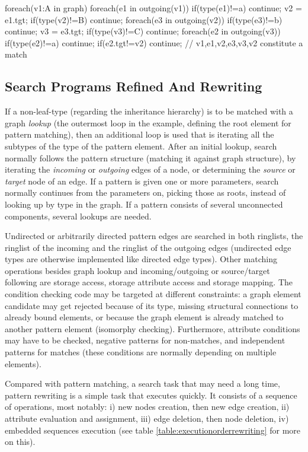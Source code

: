 \begin{csharp}
foreach(v1:A in graph) {
	foreach(e1 in outgoing(v1)) {
		if(type(e1)!=a) continue;
		v2 = e1.tgt;
		if(type(v2)!=B) continue;
		foreach(e3 in outgoing(v2)) {
			if(type(e3)!=b) continue;
			v3 = e3.tgt;
			if(type(v3)!=C) continue;
			foreach(e2 in outgoing(v3)) {
				if(type(e2)!=a) continue;
				if(e2.tgt!=v2) continue;
				// v1,e1,v2,e3,v3,v2 constitute a match
			} 
		}
	}
}
\end{csharp}

\pagebreak

\subsection*{Search Programs Refined And Rewriting} %

If a non-leaf-type (regarding the inheritance hierarchy) is to be matched with a graph \emph{lookup} (the outermost loop in the example, defining the root element for pattern matching), then an additional loop is used that is iterating all the subtypes of the type of the pattern element.
After an initial lookup, search normally follows the pattern structure (matching it against graph structure), by iterating the \emph{incoming} or \emph{outgoing} edges of a node, or determining the \emph{source} or \emph{target} node of an edge.
If a pattern is given one or more parameters, search normally continues from the parameters on, picking those as roots, instead of looking up by type in the graph.
If a pattern consists of several unconnected components, several lookups are needed.

Undirected or arbitrarily directed pattern edges are searched in both ringlists, the ringlist of the incoming and the ringlist of the outgoing edges (undirected edge types are otherwise implemented like directed edge types).
Other matching operations besides graph lookup and incoming/outgoing or source/target following are storage access, storage attribute access and storage mapping.
The condition checking code may be targeted at different constraints:
a graph element candidate may get rejected because of its type, missing structural connections to already bound elements, or because the graph element is already matched to another pattern element (isomorphy checking).
Furthermore, attribute conditions may have to be checked, negative patterns for non-matches, and independent patterns for matches (these conditions are normally depending on multiple elements).

Compared with pattern matching, a search task that may need a long time, pattern rewriting is a simple task that executes quickly. 
It consists of a sequence of operations, most notably: i) new nodes creation, then new edge creation, ii) attribute evaluation and assignment, iii) edge deletion, then node deletion, iv) embedded sequences execution (see table \ref{table:executionorderrewriting} for more on this).

